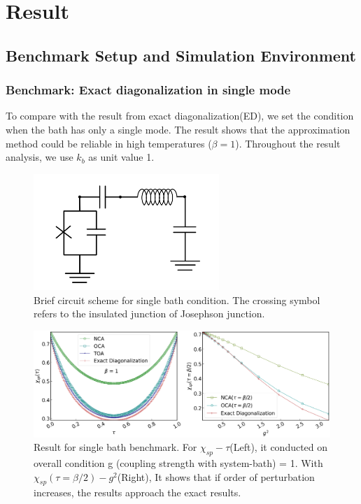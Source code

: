 \documentclass{article}[12pt]
\begin{document}
\section{Result}
\begin{spacing}{1.5}
\subsection{Benchmark Setup and Simulation Environment}
\subsubsection*{Benchmark: Exact diagonalization in single mode}
To compare with the result from exact diagonalization(ED), we set the condition when the bath has only a single mode. 
The result shows that the approximation method could be reliable in high temperatures ($\beta = 1$). Throughout the result analysis, we use $k_b$ as unit value 1.
\begin{figure}[htbp]
  \centerline{\includegraphics[width=7cm]{TexFigure/4/4_1_00_Singlebath.png}}
  \caption{Brief circuit scheme for single bath condition. The crossing symbol  refers to the insulated junction of Josephson junction.}
\end{figure}
\begin{figure}[htbp]
  \centerline{\includegraphics[width=15cm]{TexFigure/4/4_1_01_Single.png}}
  \caption{Result for single bath benchmark. For $\chi_{sp} - \tau$(Left), it conducted on overall condition g (coupling strength with system-bath) = 1.
  With $\chi_{sp}(\tau=\beta/2)-g^2$(Right), It shows that if order of perturbation increases, the results approach the exact results.}
\end{figure}
\pagebreak

\end{spacing}
\end{document}
